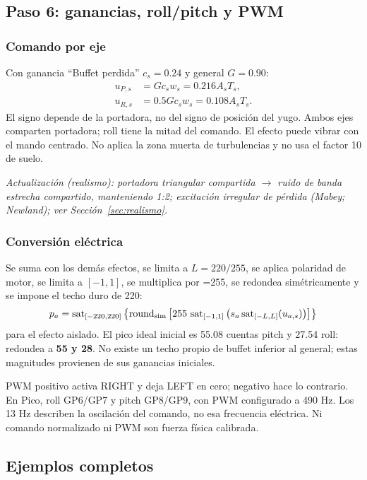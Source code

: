 \documentclass[11pt,a4paper]{article}
\newcommand{\code}[1]{\texttt{\detokenize{#1}}}
\newcommand{\sat}{\operatorname{sat}}
\begin{document}
\subsection{Paso 6: ganancias, roll/pitch y PWM}
\subsubsection{Comando por eje}
Con ganancia ``Buffet perdida'' $c_s=0.24$ y general $G=0.90$:
\begin{align}
u_{P,s}&=Gc_sw_s=0.216 A_sT_s,\\
u_{R,s}&=0.5Gc_sw_s=0.108 A_sT_s.
\end{align}
El signo depende de la portadora, no del signo de posición del yugo. Ambos ejes comparten portadora; roll tiene la mitad del comando. El efecto puede vibrar con el mando centrado. No aplica la zona muerta de turbulencias y no usa el factor 10 de suelo.

\textit{Actualización (realismo): portadora triangular compartida $\rightarrow$ ruido de banda estrecha compartido, manteniendo 1:2; excitación irregular de pérdida (Mabey; Newland); ver Sección~\ref{sec:realismo}.}

\subsubsection{Conversión eléctrica}
Se suma con los demás efectos, se limita a $L=220/255$, se aplica polaridad de motor, se limita a $[-1,1]$, se multiplica por \code{PWM_MAX}=255, se redondea simétricamente y se impone el techo duro de 220:
\begin{equation}
p_a=\sat_{[-220,220]}\left\{\operatorname{round}_{\rm sim}
\left[255\,\sat_{[-1,1]}\left(s_a\sat_{[-L,L]}(u_{a,s})\right)\right]\right\}
\end{equation}
para el efecto aislado. El pico ideal inicial es 55.08 cuentas pitch y 27.54 roll: redondea a \textbf{55 y 28}. No existe un techo propio de buffet inferior al general; estas magnitudes provienen de sus ganancias iniciales.

PWM positivo activa RIGHT y deja LEFT en cero; negativo hace lo contrario. En Pico, roll GP6/GP7 y pitch GP8/GP9, con PWM configurado a 490 Hz. Los 13 Hz describen la oscilación del comando, no esa frecuencia eléctrica. Ni comando normalizado ni PWM son fuerza física calibrada.

\subsection{Ejemplos completos}
\end{document}
